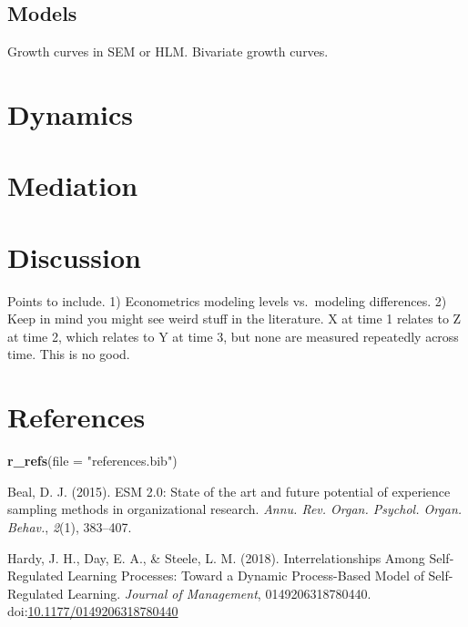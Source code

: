 \documentclass[english,,man]{apa6}
\newenvironment{Shaded}{\begin{snugshade}}{\end{snugshade}}
\newcommand{\DataTypeTok}[1]{\textcolor[rgb]{0.13,0.29,0.53}{#1}}
\newcommand{\KeywordTok}[1]{\textcolor[rgb]{0.13,0.29,0.53}{\textbf{#1}}}
\newcommand{\NormalTok}[1]{#1}
\newcommand{\StringTok}[1]{\textcolor[rgb]{0.31,0.60,0.02}{#1}}
\theoremstyle{definition}
\theoremstyle{definition}
\theoremstyle{definition}
\theoremstyle{remark}
\begin{document}
\hypertarget{models-1}{%
\subsection{Models}\label{models-1}}

Growth curves in SEM or HLM. Bivariate growth curves.

\hypertarget{dynamics}{%
\section{Dynamics}\label{dynamics}}

\hypertarget{mediation}{%
\section{Mediation}\label{mediation}}

\hypertarget{discussion}{%
\section{Discussion}\label{discussion}}

Points to include. 1) Econometrics modeling levels vs.~modeling
differences. 2) Keep in mind you might see weird stuff in the
literature. X at time 1 relates to Z at time 2, which relates to Y at
time 3, but none are measured repeatedly across time. This is no good.

\newpage

\hypertarget{references}{%
\section{References}\label{references}}

\begin{Shaded}
\begin{Highlighting}[]
\KeywordTok{r_refs}\NormalTok{(}\DataTypeTok{file =} \StringTok{"references.bib"}\NormalTok{)}
\end{Highlighting}
\end{Shaded}

\setlength{\parindent}{-0.5in}
\setlength{\leftskip}{0.5in}

\hypertarget{refs}{}
\leavevmode\hypertarget{ref-beal_esm_2015}{}%
Beal, D. J. (2015). ESM 2.0: State of the art and future potential of
experience sampling methods in organizational research. \emph{Annu. Rev.
Organ. Psychol. Organ. Behav.}, \emph{2}(1), 383--407.

\leavevmode\hypertarget{ref-hardy_interrelationships_2018}{}%
Hardy, J. H., Day, E. A., \& Steele, L. M. (2018). Interrelationships
Among Self-Regulated Learning Processes: Toward a Dynamic Process-Based
Model of Self-Regulated Learning. \emph{Journal of Management},
0149206318780440.
doi:\href{https://doi.org/10.1177/0149206318780440}{10.1177/0149206318780440}
\end{document}
